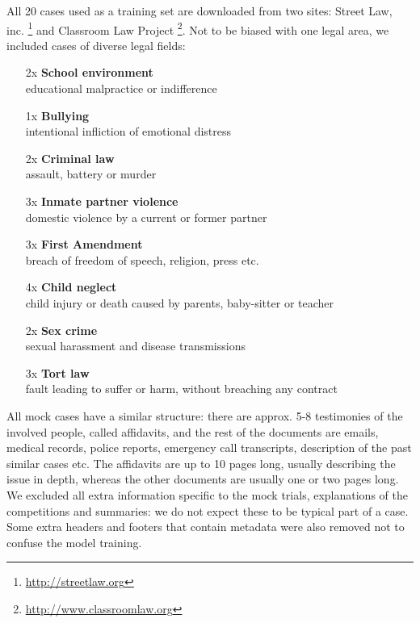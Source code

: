\documentclass[
  digital, %
  table,   %
  lof,     %
  lot,     %
]{fithesis3}
\begin{document}
All 20 cases used as a training set are downloaded from two sites: Street Law, inc. \footnote{\url{http://streetlaw.org}} and Classroom Law Project \footnote{\url{http://www.classroomlaw.org}}.
Not to be biased with one legal area, we included cases of diverse legal fields:
\begin{itemize}
\itemsep0em
\item[2x] \textbf{School environment} \\ educational malpractice or indifference
\item[1x] \textbf{Bullying} \\ intentional infliction of emotional distress
\item[2x] \textbf{Criminal law} \\ assault, battery or murder
\item[3x] \textbf{Inmate partner violence} \\ domestic violence by a current or former partner
\item[3x] \textbf{First Amendment} \\ breach of freedom of speech, religion, press etc.
\item[4x] \textbf{Child neglect} \\ child injury or death caused by parents, baby-sitter or teacher
\item[2x] \textbf{Sex crime} \\ sexual harassment and disease transmissions
\item[3x] \textbf{Tort law } \\ fault leading to suffer or harm, without breaching any contract
\end{itemize}
All mock cases have a similar structure: there are approx. 5-8 testimonies of the involved people, called affidavits, and the rest of the documents are emails, medical records, police reports, emergency call transcripts, description of the past similar cases etc.
The affidavits are up to 10 pages long, usually describing the issue in depth, whereas the other documents are usually one or two pages long.
We excluded all extra information specific to the mock trials, explanations of the competitions and summaries: we do not expect these to be typical part of a case.
Some extra headers and footers that contain metadata were also removed not to confuse the model training.
\end{document}
